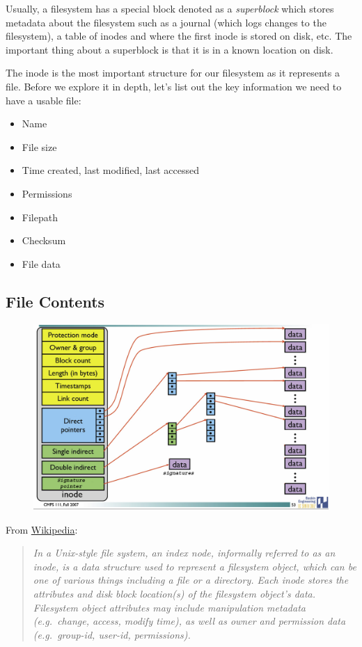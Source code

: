 Usually, a filesystem has a special block denoted as a \emph{superblock} which stores metadata about the filesystem such as a journal (which logs changes to the filesystem), a table of inodes and where the first inode is stored on disk, etc. The important thing about a superblock is that it is in a known location on disk.

The inode is the most important structure for our filesystem as it represents a file. Before we explore it in depth, let's list out the key information we need to have a usable file:

\begin{itemize}
\tightlist
  \item Name
  \item File size
  \item Time created, last modified, last accessed
  \item Permissions
  \item Filepath
  \item Checksum
  \item File data
\end{itemize}

\subsection{File Contents}

\begin{figure}[htbp]
\centering
\includegraphics[width=.8\textwidth]{filesystems/images/inode_with_signatures.jpg}
\caption{}
\end{figure}

From \href{http://en.wikipedia.org/wiki/Inode}{Wikipedia}:

\begin{quote}
\emph{In a Unix-style file system, an index node, informally referred to as an inode, is a data structure used to represent a filesystem object, which can be one of various things including a file or a directory. Each inode stores the attributes and disk block location(s) of the filesystem object's data. Filesystem object attributes may include manipulation metadata (e.g.~change, access, modify time), as well as owner and permission data (e.g.~group-id, user-id, permissions).}
\end{quote}

